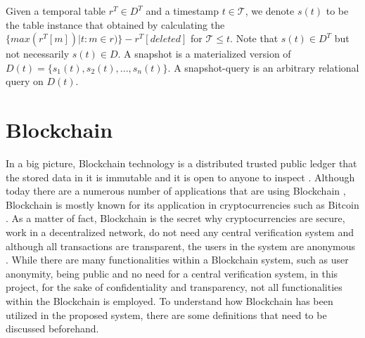 \begin{defn} 
	Given a temporal table $r^T \in D^T$ and a timestamp $t \in \mathcal{T}$, we denote $s(t)$ to be the table instance that obtained by calculating the $\{max(r^T[m])|t : m\in r)\}-r^T[deleted]$ for $\mathcal{T}\leq t$. Note that $s(t) \in D^T$ but not necessarily $s(t) \in D$. A snapshot is a materialized version of $D(t) = \{s_1(t),s_2(t),...,s_n(t)\}$. A snapshot-query is an arbitrary relational query on $D(t)$.
\label{dfn:snapshot}
\end{defn}




\section{Blockchain}
In a big picture, Blockchain technology is a distributed trusted public ledger that the stored data in it is immutable and it is open to anyone to inspect \cite{OECD2016Science}. Although today there are a numerous number of applications that are using Blockchain \cite{dhillon2017blockchain},  ‌Blockchain is mostly known for its application in cryptocurrencies such as Bitcoin \cite{nakamoto2008bitcoin}. As a matter of fact, Blockchain is the secret why cryptocurrencies are secure, work in a decentralized network, do not need any central verification system and although all transactions are transparent, the users in the system are anonymous \cite{halaburda2016beyond}.
While there are many functionalities within a Blockchain system, such as user anonymity, being public and no need for a central verification system, in this project, for the sake of confidentiality and transparency, not all functionalities within the Blockchain is employed. To understand how Blockchain has been utilized in the proposed system, there are some definitions that need to be discussed beforehand.

